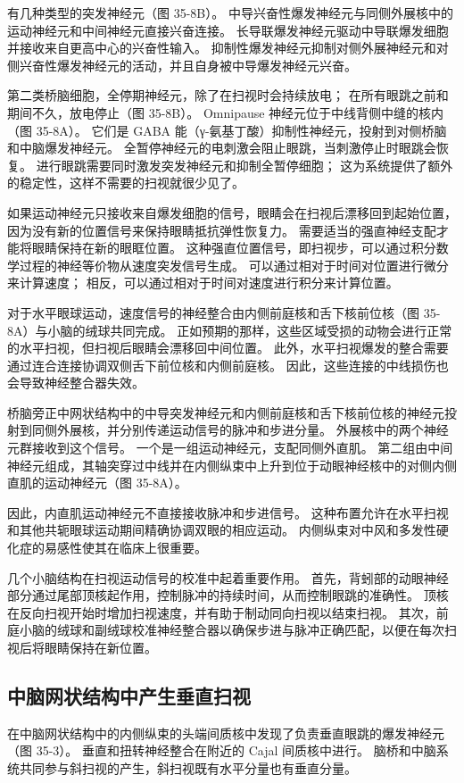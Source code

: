 有几种类型的突发神经元（图 35-8B）。 中导兴奋性爆发神经元与同侧外展核中的运动神经元和中间神经元直接兴奋连接。 长导联爆发神经元驱动中导联爆发细胞并接收来自更高中心的兴奋性输入。 抑制性爆发神经元抑制对侧外展神经元和对侧兴奋性爆发神经元的活动，并且自身被中导爆发神经元兴奋。

第二类桥脑细胞，全停期神经元，除了在扫视时会持续放电； 在所有眼跳之前和期间不久，放电停止（图 35-8B）。 Omnipause 神经元位于中线背侧中缝的核内（图 35-8A）。 它们是 GABA 能（γ-氨基丁酸）抑制性神经元，投射到对侧桥脑和中脑爆发神经元。 全暂停神经元的电刺激会阻止眼跳，当刺激停止时眼跳会恢复。 进行眼跳需要同时激发突发神经元和抑制全暂停细胞； 这为系统提供了额外的稳定性，这样不需要的扫视就很少见了。

如果运动神经元只接收来自爆发细胞的信号，眼睛会在扫视后漂移回到起始位置，因为没有新的位置信号来保持眼睛抵抗弹性恢复力。 需要适当的强直神经支配才能将眼睛保持在新的眼眶位置。 这种强直位置信号，即扫视步，可以通过积分数学过程的神经等价物从速度突发信号生成。 可以通过相对于时间对位置进行微分来计算速度； 相反，可以通过相对于时间对速度进行积分来计算位置。

对于水平眼球运动，速度信号的神经整合由内侧前庭核和舌下核前位核（图 35-8A）与小脑的绒球共同完成。 正如预期的那样，这些区域受损的动物会进行正常的水平扫视，但扫视后眼睛会漂移回中间位置。 此外，水平扫视爆发的整合需要通过连合连接协调双侧舌下前位核和内侧前庭核。 因此，这些连接的中线损伤也会导致神经整合器失效。

桥脑旁正中网状结构中的中导突发神经元和内侧前庭核和舌下核前位核的神经元投射到同侧外展核，并分别传递运动信号的脉冲和步进分量。 外展核中的两个神经元群接收到这个信号。 一个是一组运动神经元，支配同侧外直肌。 第二组由中间神经元组成，其轴突穿过中线并在内侧纵束中上升到位于动眼神经核中的对侧内侧直肌的运动神经元（图 35-8A）。

因此，内直肌运动神经元不直接接收脉冲和步进信号。 这种布置允许在水平扫视和其他共轭眼球运动期间精确协调双眼的相应运动。 内侧纵束对中风和多发性硬化症的易感性使其在临床上很重要。

几个小脑结构在扫视运动信号的校准中起着重要作用。 首先，背蚓部的动眼神经部分通过尾部顶核起作用，控制脉冲的持续时间，从而控制眼跳的准确性。 顶核在反向扫视开始时增加扫视速度，并有助于制动同向扫视以结束扫视。 其次，前庭小脑的绒球和副绒球校准神经整合器以确保步进与脉冲正确匹配，以便在每次扫视后将眼睛保持在新位置。


\subsection{中脑网状结构中产生垂直扫视}
在中脑网状结构中的内侧纵束的头端间质核中发现了负责垂直眼跳的爆发神经元（图 35-3）。 垂直和扭转神经整合在附近的 Cajal 间质核中进行。 脑桥和中脑系统共同参与斜扫视的产生，斜扫视既有水平分量也有垂直分量。

